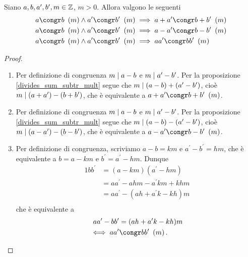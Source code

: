 \begin{proposition}
    Siano $a, b, a^\prime, b^\prime, m \in \mathbb{Z}$, $m > 0$. Allora valgono le seguenti
    \begin{align}
        &a \congr b \Mod{m}\land a^\prime \congr b^\prime \Mod{m}\implies a+a^\prime \congr b+b^\prime\Mod{m} \label{somma_congrui}\\
        &a \congr b \Mod{m}\land a^\prime \congr b^\prime \Mod{m}\implies a-a^\prime \congr b-b^\prime\Mod{m} \label{differenza_congrui}\\
        &a \congr b \Mod{m}\land a^\prime \congr b^\prime \Mod{m}\implies aa^\prime \congr bb^\prime\Mod{m} \label{prodotto_congrui}
    \end{align}
\end{proposition}
\begin{proof}
    \begin{enumerate}
        \item Per definizione di congruenza $m \mid a - b$ e $m \mid a^\prime - b^\prime$. Per la proposizione \ref{divides_sum_subtr_mult} segue che $m \mid (a - b) + (a^\prime - b^\prime)$, cioè $m \mid (a + a^\prime) - (b + b^\prime)$, che è equivalente a $a+a^\prime \congr b+b^\prime\Mod{m}$.
        \item Per definizione di congruenza $m \mid a - b$ e $m \mid a^\prime - b^\prime$. Per la proposizione \ref{divides_sum_subtr_mult} segue che $m \mid (a - b) - (a^\prime - b^\prime)$, cioè $m \mid (a - a^\prime) - (b - b^\prime)$, che è equivalente a $a-a^\prime \congr b-b^\prime\Mod{m}$.
        \item Per definizione di congruenza, scriviamo $a - b = km$ e $a^\prime - b^\prime = hm$, che è equivalente a $b = a - km$ e $b^\prime = a^\prime - hm$. Dunque
        \begin{alignat*}
            {1}
            bb^\prime &= (a - km)(a^\prime - hm) \\
                &= aa^\prime - ahm - a^\prime km + khm \\
                &= aa^\prime - (ah + a^\prime k - kh)m \\
        \end{alignat*}    
        che è equivalente a
        \begin{alignat*} {1}
            aa^\prime - bb^\prime &= (ah + a^\prime k - kh)m \\
            \iff aa^\prime &\congr bb^\prime \Mod{m}.
        \end{alignat*} \qedhere
    \end{enumerate}
\end{proof}

